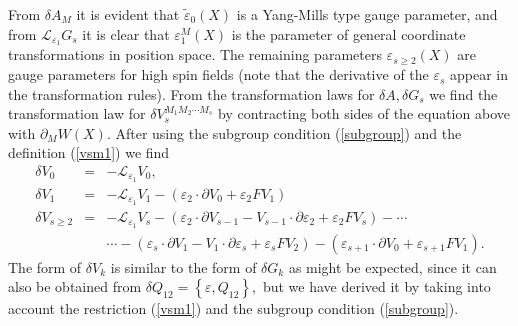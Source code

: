 \documentclass[a4paper,12pt]{article}
\begin{document}
From $\delta A_{M}$ it is evident that $\tilde{\varepsilon}_{0}\left(
X\right) $ is a Yang-Mills type gauge parameter, and from $\mathcal{L}%
_{\varepsilon _{1}}G_{s}$ it is clear that $\varepsilon _{1}^{M}\left(
X\right) $ is the parameter of general coordinate transformations in
position space. The remaining parameters $\varepsilon _{s\geq 2}\left(
X\right) $ are gauge parameters for high spin fields (note that the
derivative of the $\varepsilon _{s}$ appear in the transformation rules).
From the transformation laws for $\delta A,\delta G_{s}$ we find the
transformation law for $\delta V_{s}^{M_{1}M_{2}\cdots M_{s}}$ by
contracting both sides of the equation above with $\partial _{M}W\left(
X\right) $. After using the subgroup condition (\ref{subgroup}) and the
definition (\ref{vsm1}) we find
\begin{eqnarray}
\delta V_{0} &=&-\mathcal{L}_{\varepsilon _{1}}V_{0},\quad \\
\delta V_{1} &=&-\mathcal{L}_{\varepsilon _{1}}V_{1}-\left( \varepsilon
_{2}\cdot \partial V_{0}+\varepsilon _{2}FV_{1}\right) \\
\delta V_{s\geq 2} &=&-\mathcal{L}_{\varepsilon _{1}}V_{s}-\left(
\varepsilon _{2}\cdot \partial V_{s-1}-V_{s-1}\cdot \partial \varepsilon
_{2}+\varepsilon _{2}FV_{s}\right) -\cdots  \nonumber \\
&&\cdots -\left( \varepsilon _{s}\cdot \partial V_{1}-V_{1}\cdot \partial
\varepsilon _{s}+\varepsilon _{s}FV_{2}\right) -\left( \varepsilon
_{s+1}\cdot \partial V_{0}+\varepsilon _{s+1}FV_{1}\right) .
\end{eqnarray}
The form of $\delta V_{k}$ is similar to the form of $\delta G_{k}$ as might
be expected, since it can also be obtained from $\delta Q_{12}=\left\{
\varepsilon ,Q_{12}\right\} ,$ but we have derived it by taking into account
the restriction (\ref{vsm1}) and the subgroup condition (\ref{subgroup}).
\end{document}
